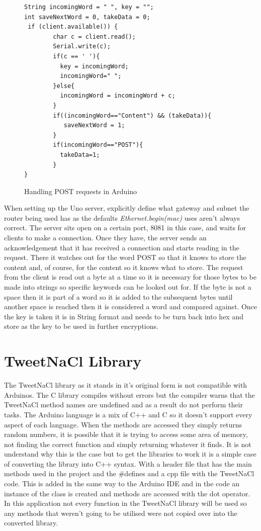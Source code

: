 \begin{figure}[H]
\begin{lstlisting}[style=Arduino]
String incomingWord = " ", key = "";
int saveNextWord = 0, takeData = 0;
 if (client.available()) {
        char c = client.read();
        Serial.write(c);
        if(c == ' '){
          key = incomingWord;
          incomingWord=" ";
        }else{
          incomingWord = incomingWord + c;
        }
        if((incomingWord=="Content") && (takeData)){
           saveNextWord = 1; 
        }
        if(incomingWord=="POST"){
          takeData=1;
        }
}
\end{lstlisting}
\caption{Handling POST requests in Arduino}
\label{snip:post}
\end{figure}

When setting up the Uno server, explicitly define what gateway and subnet the router being used has as the defaults \emph{Ethernet.begin(mac)} uses aren't always correct. The server sits open on a certain port, 8081 in this case, and waits for clients to make a connection. Once they have, the server sends an acknowledgement that it has received a connection and starts reading in the request. There it watches out for the word POST so that it knows to store the content and, of course, for the content so it knows what to store. The request from the client is read out a byte at a time so it is necessary for those bytes to be made into strings so specific keywords can be looked out for. If the byte is not a space then it is part of a word so it is added to the subsequent bytes until another space is reached then it is considered a word and compared against. Once the key is taken it is in String format and needs to be turn back into hex and store as the key to be used in further encryptions.


\section{TweetNaCl Library}

The TweetNaCl library as it stands in it's original form is not compatible with Arduinos. The C library compiles without errors but the compiler warns that the TweetNaCl method names are undefined and as a result do not perform their tasks. The Arduino language is a mix of C++ and C so it doesn't support every aspect of each language. When the methods are accessed they simply returns random numbers, it is possible that it is trying to access some area of memory, not finding the correct function and simply returning whatever it finds. It is not understand why this is the case but to get the libraries to work it is a simple case of converting the library into C++ syntax. With a header file that has the main methods used in the project and the \#defines and a cpp file with the TweetNaCl code. This is added in the same way to the Arduino IDE and in the code an instance of the class is created and methods are accessed with the dot operator. In this application not every function in the TweetNaCl library will be used so any methods that weren't going to be utilised were not copied over into the converted library.



